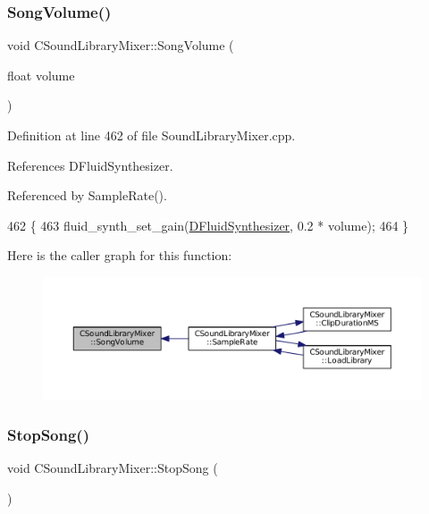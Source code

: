 \subsubsection{\texorpdfstring{Song\+Volume()}{SongVolume()}}
{\footnotesize\ttfamily void C\+Sound\+Library\+Mixer\+::\+Song\+Volume (\begin{DoxyParamCaption}\item[{float}]{volume }\end{DoxyParamCaption})}



Definition at line 462 of file Sound\+Library\+Mixer.\+cpp.



References D\+Fluid\+Synthesizer.



Referenced by Sample\+Rate().


\begin{DoxyCode}
462                                                \{
463     fluid\_synth\_set\_gain(\hyperlink{classCSoundLibraryMixer_a6c1663c381dbf2aa18c82a23141f409c}{DFluidSynthesizer}, 0.2 * volume);
464 \}
\end{DoxyCode}
Here is the caller graph for this function\+:\nopagebreak
\begin{figure}[H]
\begin{center}
\leavevmode
\includegraphics[width=350pt]{classCSoundLibraryMixer_ad38d70e5783e3b67fdf022877549ccf8_icgraph}
\end{center}
\end{figure}
\hypertarget{classCSoundLibraryMixer_a13fdebfbc5fdee60067c38a3c60dd2a9}{}\label{classCSoundLibraryMixer_a13fdebfbc5fdee60067c38a3c60dd2a9} 
\subsubsection{\texorpdfstring{Stop\+Song()}{StopSong()}}
{\footnotesize\ttfamily void C\+Sound\+Library\+Mixer\+::\+Stop\+Song (\begin{DoxyParamCaption}{ }\end{DoxyParamCaption})}



